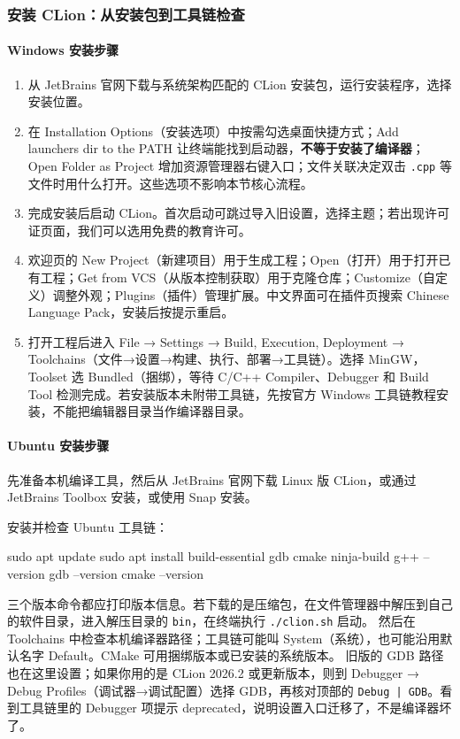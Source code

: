 \subsubsection{安装 CLion：从安装包到工具链检查}

\paragraph*{Windows 安装步骤}
\begin{enumerate}
\item 从 JetBrains 官网下载与系统架构匹配的 CLion 安装包，运行安装程序，选择安装位置。
\item 在 Installation Options（安装选项）中按需勾选桌面快捷方式；Add launchers dir to the PATH 让终端能找到启动器，\textbf{不等于安装了编译器}；Open Folder as Project 增加资源管理器右键入口；文件关联决定双击 \texttt{.cpp} 等文件时用什么打开。这些选项不影响本节核心流程。
\item 完成安装后启动 CLion。首次启动可跳过导入旧设置，选择主题；若出现许可证页面，我们可以选用免费的教育许可。
\item 欢迎页的 New Project（新建项目）用于生成工程；Open（打开）用于打开已有工程；Get from VCS（从版本控制获取）用于克隆仓库；Customize（自定义）调整外观；Plugins（插件）管理扩展。中文界面可在插件页搜索 Chinese Language Pack，安装后按提示重启。
\item 打开工程后进入 File → Settings → Build, Execution, Deployment → Toolchains（文件→设置→构建、执行、部署→工具链）。选择 MinGW，Toolset 选 Bundled（捆绑），等待 C/C++ Compiler、Debugger 和 Build Tool 检测完成。若安装版本未附带工具链，先按官方 Windows 工具链教程安装，不能把编辑器目录当作编译器目录。
\end{enumerate}

\paragraph*{Ubuntu 安装步骤}
先准备本机编译工具，然后从 JetBrains 官网下载 Linux 版 CLion，或通过 JetBrains Toolbox 安装，或使用 Snap 安装。
\begin{example}
安装并检查 Ubuntu 工具链：


\begin{tbash}
sudo apt update
sudo apt install build-essential gdb cmake ninja-build
g++ --version
gdb --version
cmake --version
\end{tbash}


三个版本命令都应打印版本信息。若下载的是压缩包，在文件管理器中解压到自己的软件目录，进入解压目录的 \texttt{bin}，在终端执行 \texttt{./clion.sh} 启动。
然后在 Toolchains 中检查本机编译器路径；工具链可能叫 System（系统），也可能沿用默认名字 Default。CMake 可用捆绑版本或已安装的系统版本。
旧版的 GDB 路径也在这里设置；如果你用的是 CLion 2026.2 或更新版本，则到 Debugger → Debug Profiles（调试器→调试配置）选择 GDB，再核对顶部的 \texttt{Debug | GDB}。看到工具链里的 Debugger 项提示 deprecated，说明设置入口迁移了，不是编译器坏了。
\end{example}


